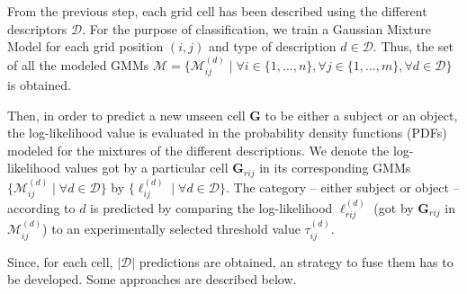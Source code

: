 \documentclass[10pt,twocolumn,letterpaper]{article}
\begin{document}
From the previous step, each grid cell has been described using the different descriptors $\mathcal{D}$. For the purpose of classification, we train a Gaussian Mixture Model for each grid position $(i,j)$ and type of description $d \in \mathcal{D}$. Thus, the set of all the modeled GMMs $\mathcal{M} = \{\mathcal{M}_{ij}^{(d)} \;|\; \forall i \in \{1,...,n\}, \forall j \in \{1,...,m\}, \forall d \in \mathcal{D} \}$ is obtained.

Then, in order to predict a new unseen cell $\mathbf{G}$ to be either a subject or an object, the log-likelihood value is evaluated in the probability density functions (PDFs) modeled for the mixtures of the different descriptions. We denote the log-likelihood values got by a particular cell $\mathbf{G}_{rij}$ in its corresponding GMMs $\{\mathcal{M}_{ij}^{(d)} \;|\; \forall d \in \mathcal{D}\}$ by $\{\ell_{ij}^{(d)} \;|\; \forall d \in \mathcal{D}\}$. The category -- either subject or object -- according to $d$ is predicted by comparing the log-likelihood $\ell_{rij}^{(d)}$ (got by $\mathbf{G}_{rij}$ in $\mathcal{M}_{ij}^{(d)}$) to an experimentally selected threshold value $\tau_{ij}^{(d)}$. 

Since, for each cell, $|\mathcal{D}|$ predictions are obtained, an strategy to fuse them has to be developed. Some approaches are described below.

\end{document}
